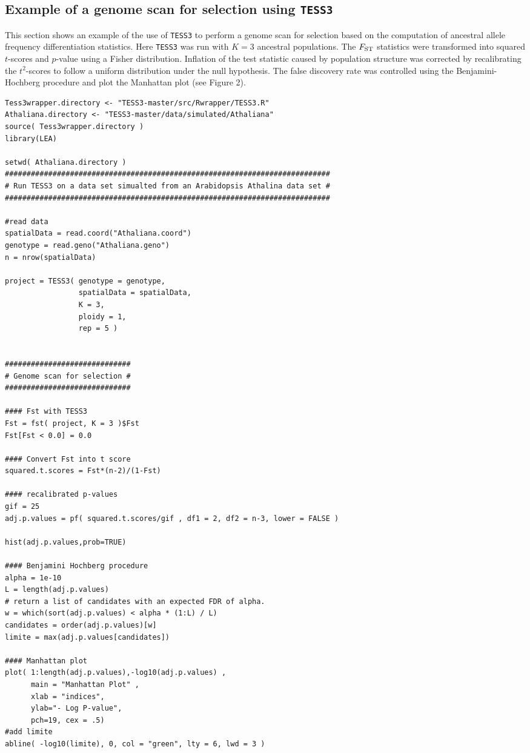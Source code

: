 \documentclass[10pt,a4paper]{article}
\begin{document}
\subsection{Example of a genome scan for selection using {\tt TESS3}}
This section shows an example of the use of {\tt TESS3} to perform a genome scan for selection based on the computation of ancestral allele frequency differentiation statistics. Here {\tt TESS3} was run with $K = 3$ ancestral populations. The $F_{\rm ST}$ statistics were transformed into squared $t$-scores and $p$-value using a Fisher distribution. Inflation of the test statistic caused by population structure was corrected by recalibrating the $t^2$-scores to follow a uniform distribution under the null hypothesis. The false discovery rate was controlled using the Benjamini-Hochberg procedure and plot the Manhattan plot (see Figure 2).


\begin{Verbatim}[frame=single]
Tess3wrapper.directory <- "TESS3-master/src/Rwrapper/TESS3.R"
Athaliana.directory <- "TESS3-master/data/simulated/Athaliana"
source( Tess3wrapper.directory )
library(LEA)

setwd( Athaliana.directory )
###########################################################################
# Run TESS3 on a data set simualted from an Arabidopsis Athalina data set #
###########################################################################

#read data
spatialData = read.coord("Athaliana.coord")
genotype = read.geno("Athaliana.geno")
n = nrow(spatialData)

project = TESS3( genotype = genotype, 
                 spatialData = spatialData, 
                 K = 3, 
                 ploidy = 1, 
                 rep = 5 )


#############################
# Genome scan for selection #
#############################

#### Fst with TESS3 
Fst = fst( project, K = 3 )$Fst
Fst[Fst < 0.0] = 0.0

#### Convert Fst into t score
squared.t.scores = Fst*(n-2)/(1-Fst)

#### recalibrated p-values
gif = 25
adj.p.values = pf( squared.t.scores/gif , df1 = 2, df2 = n-3, lower = FALSE )

hist(adj.p.values,prob=TRUE)

#### Benjamini Hochberg procedure
alpha = 1e-10
L = length(adj.p.values)
# return a list of candidates with an expected FDR of alpha.
w = which(sort(adj.p.values) < alpha * (1:L) / L)
candidates = order(adj.p.values)[w]
limite = max(adj.p.values[candidates])

#### Manhattan plot 
plot( 1:length(adj.p.values),-log10(adj.p.values) , 
      main = "Manhattan Plot" , 
      xlab = "indices", 
      ylab="- Log P-value", 
      pch=19, cex = .5) 
#add limite
abline( -log10(limite), 0, col = "green", lty = 6, lwd = 3 )
\end{Verbatim}
\end{document}
